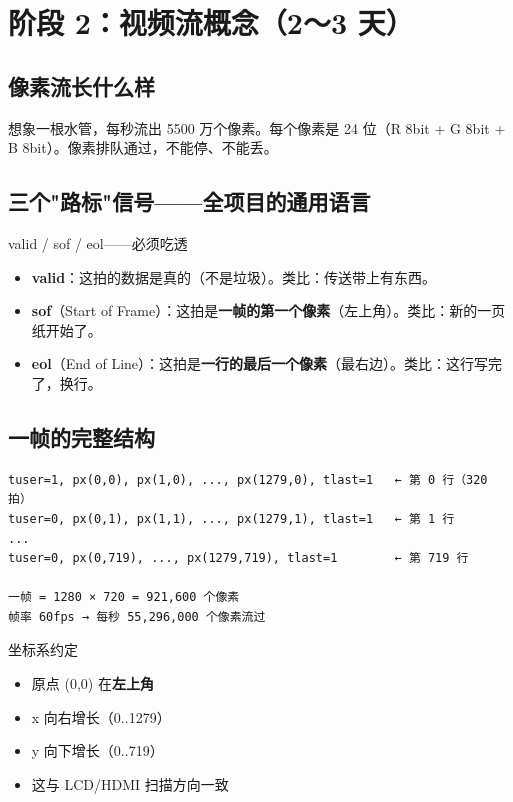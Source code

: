 \documentclass[11pt]{ctexart}
\begin{document}
\section{阶段 2：视频流概念（2～3 天）}

\subsection{像素流长什么样}

想象一根水管，每秒流出 5500 万个像素。每个像素是 24 位（R 8bit + G 8bit + B 8bit）。像素排队通过，不能停、不能丢。

\subsection{三个"路标"信号——全项目的通用语言}

\begin{keybox}{valid / sof / eol——必须吃透}
\begin{itemize}
  \item \textbf{valid}：这拍的数据是真的（不是垃圾）。类比：传送带上有东西。
  \item \textbf{sof}（Start of Frame）：这拍是\textbf{一帧的第一个像素}（左上角）。类比：新的一页纸开始了。
  \item \textbf{eol}（End of Line）：这拍是\textbf{一行的最后一个像素}（最右边）。类比：这行写完了，换行。
\end{itemize}
\end{keybox}

\subsection{一帧的完整结构}

\begin{Verbatim}[frame=single,fontsize=\small]
tuser=1, px(0,0), px(1,0), ..., px(1279,0), tlast=1   ← 第 0 行（320 拍）
tuser=0, px(0,1), px(1,1), ..., px(1279,1), tlast=1   ← 第 1 行
...
tuser=0, px(0,719), ..., px(1279,719), tlast=1        ← 第 719 行

一帧 = 1280 × 720 = 921,600 个像素
帧率 60fps → 每秒 55,296,000 个像素流过
\end{Verbatim}

\begin{tipbox}{坐标系约定}
\begin{itemize}
  \item 原点 (0,0) 在\textbf{左上角}
  \item x 向右增长（0..1279）
  \item y 向下增长（0..719）
  \item 这与 LCD/HDMI 扫描方向一致
\end{itemize}
\end{tipbox}
\end{document}
